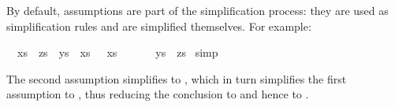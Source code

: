 %
\begin{isabellebody}%
%
\begin{isamarkuptext}%
By default, assumptions are part of the simplification process: they are used
as simplification rules and are simplified themselves. For example:%
\end{isamarkuptext}%
\ {\isachardoublequote}{\isasymlbrakk}\ xs\ {\isacharat}\ zs\ {\isacharequal}\ ys\ {\isacharat}\ xs{\isacharsemicolon}\ {\isacharbrackleft}{\isacharbrackright}\ {\isacharat}\ xs\ {\isacharequal}\ {\isacharbrackleft}{\isacharbrackright}\ {\isacharat}\ {\isacharbrackleft}{\isacharbrackright}\ {\isasymrbrakk}\ {\isasymLongrightarrow}\ ys\ {\isacharequal}\ zs{\isachardoublequote}\isanewline
{}\ simp%
\begin{isamarkuptext}%
\noindent
The second assumption simplifies to , which in turn
simplifies the first assumption to , thus reducing the
conclusion to  and hence to .


\end{isamarkuptext}
\end{isabellebody}
